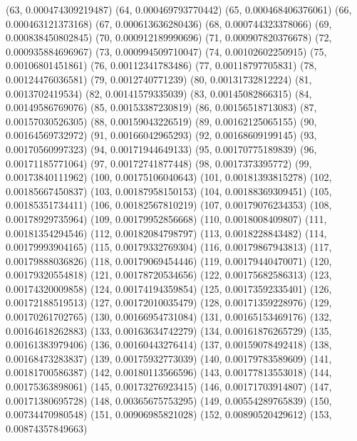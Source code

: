 {					(63, 0.000474309219487)
					(64, 0.000469793770442)
					(65, 0.000468406376061)
					(66, 0.000463121373168)
					(67, 0.000613636280436)
					(68, 0.000744323378066)
					(69, 0.000838450802845)
					(70, 0.000912189990696)
					(71, 0.000907820376678)
					(72, 0.000935884696967)
					(73, 0.000994509710047)
					(74, 0.00102602250915)
					(75, 0.00106801451861)
					(76, 0.00112341783486)
					(77, 0.00118797705831)
					(78, 0.00124476036581)
					(79, 0.0012740771239)
					(80, 0.00131732812224)
					(81, 0.0013702419534)
					(82, 0.00141579335039)
					(83, 0.00145082866315)
					(84, 0.00149586769076)
					(85, 0.00153387230819)
					(86, 0.00156518713083)
					(87, 0.00157030526305)
					(88, 0.00159043226519)
					(89, 0.00162125065155)
					(90, 0.00164569732972)
					(91, 0.00166042965293)
					(92, 0.00168609199145)
					(93, 0.00170560997323)
					(94, 0.00171944649133)
					(95, 0.00170775189839)
					(96, 0.00171185771064)
					(97, 0.00172741877448)
					(98, 0.0017373395772)
					(99, 0.00173840111962)
					(100, 0.00175106040643)
					(101, 0.00181393815278)
					(102, 0.00185667450837)
					(103, 0.00187958150153)
					(104, 0.00188369309451)
					(105, 0.00185351734411)
					(106, 0.00182567810219)
					(107, 0.00179076234353)
					(108, 0.00178929735964)
					(109, 0.00179952856668)
					(110, 0.0018008409807)
					(111, 0.00181354294546)
					(112, 0.00182084798797)
					(113, 0.0018228843482)
					(114, 0.00179993904165)
					(115, 0.00179332769304)
					(116, 0.00179867943813)
					(117, 0.00179888036826)
					(118, 0.00179069454446)
					(119, 0.00179440470071)
					(120, 0.00179320554818)
					(121, 0.00178720534656)
					(122, 0.00175682586313)
					(123, 0.00174320009858)
					(124, 0.00174194359854)
					(125, 0.00173592335401)
					(126, 0.00172188519513)
					(127, 0.00172010035479)
					(128, 0.00171359228976)
					(129, 0.00170261702765)
					(130, 0.00166954731084)
					(131, 0.00165153469176)
					(132, 0.00164618262883)
					(133, 0.00163634742279)
					(134, 0.00161876265729)
					(135, 0.00161383979406)
					(136, 0.00160443276414)
					(137, 0.00159078492418)
					(138, 0.00168473283837)
					(139, 0.00175932773039)
					(140, 0.00179783589609)
					(141, 0.00181700586387)
					(142, 0.00180113566596)
					(143, 0.00177813553018)
					(144, 0.00175363898061)
					(145, 0.00173276923415)
					(146, 0.00171703914807)
					(147, 0.00171380695728)
					(148, 0.00365675753295)
					(149, 0.00554289765839)
					(150, 0.00734470980548)
					(151, 0.00906985821028)
					(152, 0.00890520429612)
					(153, 0.00874357849663)
}
